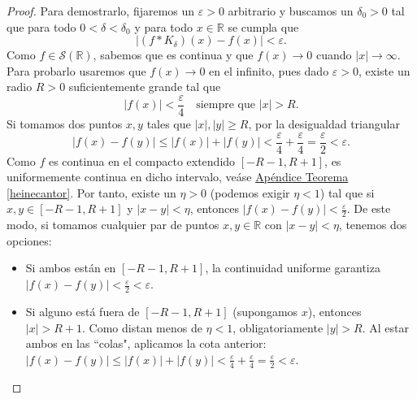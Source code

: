 \documentclass[12pt]{article}
\newcommand{\R}{\mathbb{R}}
\newcommand{\Sc}{\mathcal{S}(\mathbb{R})}
\theoremstyle{plain}
\theoremstyle{definition}
\numberwithin{equation}{section}
\begin{document}
            \begin{proof}
                Para demostrarlo, fijaremos un \(\varepsilon > 0\) arbitrario y buscamos un \(\delta_0 > 0\) tal que para todo \(0 < \delta < \delta_0\) y para todo \(x \in \R\) se cumpla que
                \begin{equation*}
                    \left\lvert (f * K_\delta)(x) - f(x) \right\rvert < \varepsilon.
                \end{equation*}
                Como \(f \in \Sc\), sabemos que es continua y que \(f(x) \to 0\) cuando \(\left\lvert x \right\rvert \to \infty\). Para probarlo usaremos que \(f(x) \to 0\) en el infinito, pues dado \(\varepsilon > 0\), existe un radio \(R > 0\) suficientemente grande tal que
                \begin{equation*}
                    \left\lvert f(x) \right\rvert < \frac{\varepsilon}{4} \quad \text{siempre que } \left\lvert x \right\rvert > R.
                \end{equation*}
                Si tomamos dos puntos \(x, y\) tales que \(\left\lvert x \right\rvert, \left\lvert y \right\rvert \ge R\), por la desigualdad triangular
                \begin{equation*}
                    \left\lvert f(x) - f(y) \right\rvert \le \left\lvert f(x) \right\rvert + \left\lvert f(y) \right\rvert < \frac{\varepsilon}{4} + \frac{\varepsilon}{4} = \frac{\varepsilon}{2} < \varepsilon.
                \end{equation*}
                Como \(f\) es continua en el compacto extendido \([-R-1, R+1]\), es uniformemente continua en dicho intervalo, veáse \hyperref[heinecantor]{Apéndice Teorema \ref*{heinecantor}}. Por tanto, existe un \(\eta > 0\) (podemos exigir \(\eta < 1\)) tal que si \(x, y \in [-R-1, R+1]\) y \(\left\lvert x - y \right\rvert < \eta\), entonces \(\left\lvert f(x) - f(y) \right\rvert < \frac{\varepsilon}{2}\).
                De este modo, si tomamos cualquier par de puntos \(x, y \in \R\) con \(\left\lvert x - y \right\rvert < \eta\), tenemos dos opciones:
                \begin{itemize}
                    \item Si ambos están en \([-R-1, R+1]\), la continuidad uniforme garantiza \(\left\lvert f(x) - f(y) \right\rvert < \frac{\varepsilon}{2} < \varepsilon\).
                    \item Si alguno está fuera de \([-R-1, R+1]\) (supongamos \(x\)), entonces \(\left\lvert x\right\rvert > R+1\). Como distan menos de \(\eta < 1\), obligatoriamente \(\left\lvert y\right\rvert > R\). Al estar ambos en las ``colas", aplicamos la cota anterior: \(\left\lvert f(x) - f(y) \right\rvert \le \left\lvert f(x) \right\rvert + \left\lvert f(y) \right\rvert < \frac{\varepsilon}{4} + \frac{\varepsilon}{4} = \frac{\varepsilon}{2} < \varepsilon\).

\end{itemize}
\end{proof}
\end{document}
